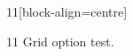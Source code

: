 \documentclass[paper=A4]{ropas-poster}
\begin{document}
\begin{postergrid}{1}{1}[block-align=centre]
\begin{posterblock}{1}{1}
Grid option test.
\end{posterblock}
\end{postergrid}
\end{document}
